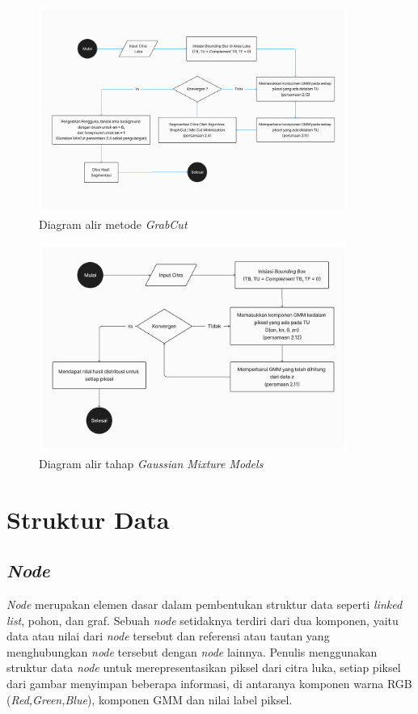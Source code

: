 \begin{figure}[H]
	\centering{}
	\includegraphics[width=0.9\textwidth]{gambar/diagram_grabcut.png}
	\caption{Diagram alir metode \emph{GrabCut}}
  \end{figure}

\begin{figure}[H]
	\centering{}
	\includegraphics[width=0.9\textwidth]{gambar/diagram_gmm.png}
	\caption{Diagram alir tahap \emph{Gaussian Mixture Models}}
  \end{figure}

\section{Struktur Data}

\subsection{\emph{Node}}

\emph{Node} merupakan elemen dasar dalam pembentukan struktur data seperti \emph{linked list},
pohon, dan graf. Sebuah \emph{node} setidaknya terdiri dari dua komponen, yaitu 
data atau nilai dari \emph{node} tersebut dan referensi atau tautan yang menghubungkan 
\emph{node} tersebut dengan \emph{node} lainnya. Penulis menggunakan struktur data \emph{node} untuk merepresentasikan piksel dari
citra luka, setiap piksel dari gambar menyimpan beberapa informasi, di antaranya komponen warna
RGB (\emph{Red,Green,Blue}), komponen GMM dan nilai label piksel.

